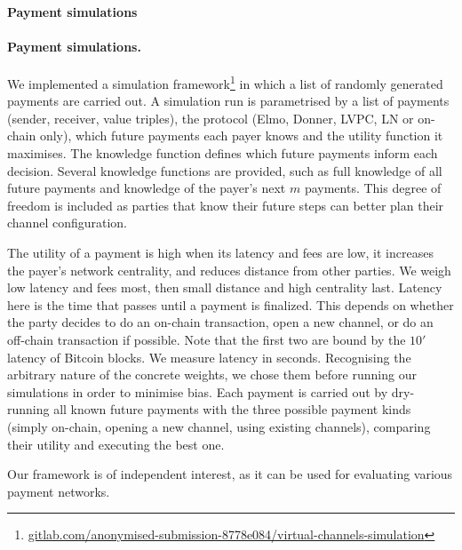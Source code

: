   \makeatletter%
    {\paragraph{Payment simulations}}%
    {\paragraph{Payment simulations.}}%
  \makeatother%
  We implemented a simulation
  framework\footnote{\url{gitlab.com/anonymised-submission-8778e084/virtual-channels-simulation}}
  in which a list of randomly generated payments are carried out.
  A simulation run is parametrised by a list of payments
  (sender, receiver, value triples), the protocol (Elmo, Donner, LVPC, LN or
  on-chain only), which future payments each payer knows and the utility
  function it maximises. The knowledge function defines which future payments
  inform each decision.
  Several knowledge functions are provided, such as full
  knowledge of all future payments and knowledge of the payer's next $m$
  payments. This degree of freedom is included as parties that know their future
  steps can better plan their channel configuration.

  The utility of a payment is high when its latency and fees are
  low, it increases the payer's network centrality, and reduces
  distance from other parties. We weigh low latency
  and fees most, then small distance and high centrality last.
  Latency here is the time that passes until a payment is finalized. This depends on whether the party decides to do an on-chain transaction, open a new channel, or do an off-chain transaction if possible. Note that the first two are bound by the \raisebox{0.5ex}{\texttildelow}$10'$ latency of Bitcoin blocks. We measure latency in seconds.
  Recognising the arbitrary nature of the concrete weights, we
  chose them before running our simulations in order to minimise
  bias.
  Each payment is carried out by dry-running all known future
  payments with the three possible payment kinds (simply
  on-chain, opening a new channel, using existing
  channels), comparing their utility and executing the best one.

  Our framework is of independent interest, as it can be used for evaluating
  various payment networks.

